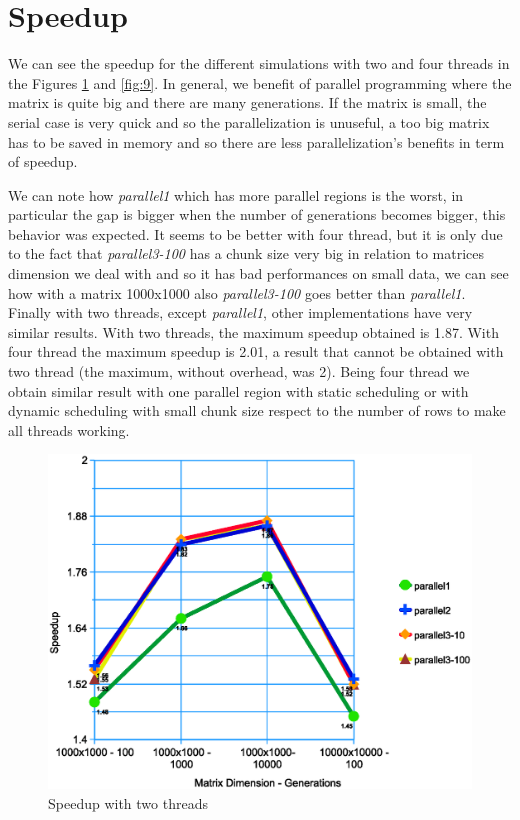 \documentclass[a4paper,11pt,twoside]{report}
\begin{document}
\section{Speedup}

We can see the speedup for the different simulations with two and four threads in the Figures \ref{fig:8} and \ref{fig:9}. In general, we benefit of parallel programming where the matrix is quite big and there are many generations. If the matrix is small, the serial case is very quick and so the parallelization is unuseful, a too big matrix has to be saved in memory and so there are less parallelization's benefits in term of speedup.

\noindent We can note how \emph{parallel1} which has more parallel regions is the worst, in particular the gap is bigger when the number of generations becomes bigger, this behavior was expected. It seems to be better with four thread, but it is only due to the fact that \emph{parallel3-100} has a chunk size very big in relation to matrices dimension we deal with and so it has bad performances on small data, we can see how with a matrix 1000x1000 also \emph{parallel3-100}
goes better than \emph{parallel1}. Finally with two threads, except \emph{parallel1}, other implementations have very similar results. With two threads, the maximum speedup obtained is 1.87.
With four thread the maximum speedup is 2.01, a result that cannot be obtained with two thread (the maximum, without overhead, was 2). Being four thread we obtain similar result with one parallel region with static scheduling or with dynamic scheduling with small chunk size respect to the number of rows to make all threads working.
\begin{center}
\begin{figure}
	\centering
	\includegraphics[scale = 0.5]{2.eps}
	\caption{Speedup with two threads} \label{fig:8}
\end{figure}
\end{center}
\end{document}
